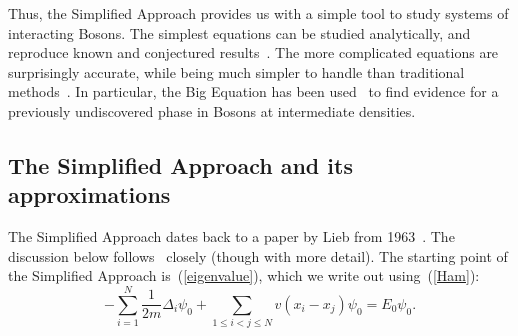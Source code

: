 \documentclass{ian}
\begin{document}
\indent
Thus, the Simplified Approach provides us with a simple tool to study systems of interacting Bosons.
The simplest equations can be studied analytically, and reproduce known and conjectured results\-~\cite{CJL20,CJL21,Ja22}.
The more complicated equations are surprisingly accurate, while being much simpler to handle than traditional methods\-~\cite{CHe21,Ja23b}.
In particular, the Big Equation has been used\-~\cite{Ja23b} to find evidence for a previously undiscovered phase in Bosons at intermediate densities.

\subsection{The Simplified Approach and its approximations}
\indent
The Simplified Approach dates back to a paper by Lieb from 1963\-~\cite{Li63}.
The discussion below follows\-~\cite{Li63} closely (though with more detail).
The starting point of the Simplified Approach is\-~(\ref{eigenvalue}), which we write out using\-~(\ref{Ham}):
\begin{equation}
  -\sum_{i=1}^N\frac1{2m}\Delta_{i}\psi_0+\sum_{1\leqslant i<j\leqslant N}v(x_i-x_j)\psi_0
  =E_0\psi_0
  .
  \label{starteq}
\end{equation}
\bigskip
\end{document}
